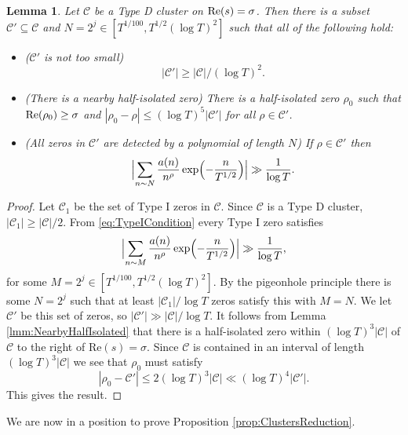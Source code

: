 \documentclass[12pt]{amsart}
\theoremstyle{plain}
\newtheorem{lemma}[theorem]{Lemma}
\theoremstyle{definition}
\theoremstyle{remark}
\begin{document}
%
%
%
%
\begin{lemma}\label{lmm:TypeDSubset}
Let $\mathcal{C}$ be a Type D cluster on $\textup{Re}(s)=\sigma$. Then there is a subset $\mathcal{C}'\subseteq\mathcal{C}$ and $N=2^j\in[T^{1/100},T^{1/2}(\log{T})^2]$ such that all of the following hold:
\begin{itemize}
\item ($\mathcal{C}'$ is not too small)
\[
|\mathcal{C}'|\ge|\mathcal{C}|/(\log{T})^2.
\]
\item (There is a nearby half-isolated zero) There is a half-isolated zero $\rho_0$ such that $\textup{Re}(\rho_0)\ge \sigma$ and $|\rho_0-\rho|\le (\log{T})^5|\mathcal{C}'|$ for all $\rho\in\mathcal{C}'$.
\item (All zeros in $\mathcal{C}'$ are detected by a polynomial of length $N$) If $\rho\in\mathcal{C}'$ then
\[
\Bigl|\sum_{n\sim N} \frac{a(n)}{n^\rho}\exp \Bigl( - \frac{n}{T^{1/2}}\Bigr) \Bigr| \gg \frac{1}{\log T}.
\]
\end{itemize}
\end{lemma}
%
%
%
%
\begin{proof}
Let $\mathcal{C}_1$ be the set of Type I zeros in $\mathcal{C}$. Since $\mathcal{C}$ is a Type D cluster, $|\mathcal{C}_1|\ge |\mathcal{C}|/2$. From  \eqref{eq:TypeICondition} every Type I zero satisfies
\[
\Bigl|\sum_{n\sim M} \frac{a(n)}{n^\rho} \exp \Bigl( - \frac{n}{T^{1/2}}\Bigr) \Bigr| \gg \frac{1}{\log T},
\]
for some $M=2^j\in [T^{1/100},T^{1/2}(\log{T})^2]$. By the pigeonhole principle there is some $N=2^j$ such that at least $|\mathcal{C}_1|/\log{T}$ zeros satisfy this with $M=N$. We let $\mathcal{C}'$ be this set of zeros, so $|\mathcal{C}'|\gg|\mathcal{C}|/\log{T}$. It follows from Lemma \ref{lmm:NearbyHalfIsolated} that there is a half-isolated zero within $(\log{T})^3|\mathcal{C}|$ of $\mathcal{C}$ to the right of $\text{Re}(s)=\sigma$. Since $\mathcal{C}$ is contained in an interval of length $(\log{T})^3|\mathcal{C}|$ we see that $\rho_0$ must satisfy
\[
|\rho_0-\mathcal{C}'|\le 2(\log{T})^3|\mathcal{C}|\ll (\log{T})^4|\mathcal{C}'|.
\]
This gives the result.
\end{proof}
%
%
%
%
We are now in a position to prove Proposition \ref{prop:ClustersReduction}.
%
%
%
%
\end{document}
